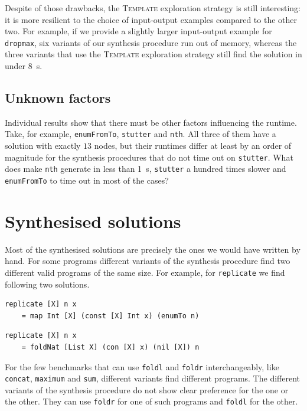 Despite of those drawbacks, the \textsc{Template} exploration strategy is still interesting: it is more resilient to the choice of input-output examples compared to the other two. For example, if we provide a slightly larger input-output example for \lstinline?dropmax?, six variants of our synthesis procedure run out of memory, whereas the three variants that use the \textsc{Template} exploration strategy still find the solution in under \SI{8}{s}.

\subsection{Unknown factors}
Individual results show that there must be other factors influencing the runtime. Take, for example, \lstinline?enumFromTo?, \lstinline?stutter? and \lstinline?nth?. All three of them have a solution with exactly $13$ nodes, but their runtimes differ at least by an order of magnitude for the synthesis procedures that do not time out on \lstinline?stutter?. What does make \lstinline?nth? generate in less than \SI{1}{s}, \lstinline?stutter? a hundred times slower and \lstinline?enumFromTo? to time out in most of the cases?

\section{Synthesised solutions}
Most of the synthesised solutions are precisely the ones we would have written by hand. For some programs different variants of the synthesis procedure find two different valid programs of the same size. For example, for \lstinline?replicate? we find following two solutions.
\begin{lstlisting}
replicate [X] n x
    = map Int [X] (const [X] Int x) (enumTo n)
\end{lstlisting}
\begin{lstlisting}
replicate [X] n x
    = foldNat [List X] (con [X] x) (nil [X]) n
\end{lstlisting}

For the few benchmarks that can use \lstinline?foldl? and \lstinline?foldr? interchangeably, like \lstinline?concat?, \lstinline?maximum? and \lstinline?sum?, different variants find different programs. The different variants of the synthesis procedure do not show clear preference for the one or the other. They can use \lstinline?foldr? for one of such programs and \lstinline?foldl? for the other.


